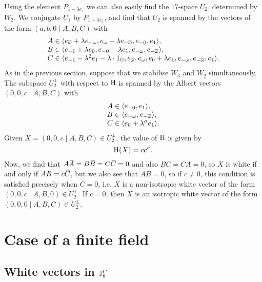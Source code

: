 Using the element $P_{1 - \lambda e_1}$ we can also easily find the $17$-space $U_2$, determined
by $W_2$. We conjugate $U_1$ by $P_{1-\lambda e_1}$, and find that $U_2$ is spanned by the vectors
of the form $(a,b,0\mid A,B,C)$ with
\begin{equation}
	\begin{array}{r@{\;}c@{\;}l}
		A & \in & \langle e_{\bar{\omega}}+\lambda e_{-\omega}, e_{\omega}-\lambda e_{-\bar{\omega}}
		, e_{-0}, e_1
		\rangle, \\
		B & \in & \langle e_{-1}+\lambda e_0, e_{-0} - \lambda e_1,
	e_{-\omega}, e_{-\bar{\omega}}  \rangle, \\
		C & \in & \langle e_{-1}-\lambda^2 e_1 - \lambda \cdot 1_{\O}, e_{\bar{\omega}}, e_{\omega},
	e_0 + \lambda e_1, e_{-\omega}, e_{-\bar{\omega}}, e_1 \rangle.
	\end{array}
\end{equation}
As in the previous section, suppose that we stabilise $W_3$ and $W_2$ simultaneously. The subspace
$U_2^{\perp}$ with respect to $\mathrm{H}$ is spanned by the Albert vectors $(0,0,c\mid A,B,C)$ with 
\begin{equation}
	\begin{array}{r@{\;}c@{\;}l}
		A & \in & \langle e_{-0}, e_{1} \rangle, \\
		B & \in & \langle e_{-\omega}, e_{-\bar{\omega}} \rangle, \\
		C & \in & \langle e_{0} + \lambda^{\s} e_1 \rangle. 
	\end{array}
\end{equation}
Given $X = (0,0,c\mid A,B,C) \in U_2^{\perp}$, the value of $\mathrm{H}$ is given by
\begin{equation}
	\mathrm{H}(X) = c c^{\sigma}. 
\end{equation}
Now, we find that $A\ovA = B\ovB = C\ovC = 0$ and also $BC = CA = 0$, so $X$ is white
if and only if $AB = c\mathord{\mbox{\hspace*{0pt}}\,\overline{\!C\!\!\;}\!\:}\mbox{\hspace*{0pt}}$, but we also see that $AB = 0$, so if $c \neq 0$, this condition
is satisfied precisely when $C = 0$, i.e. $X$ is a non-isotropic white vector of the form
$(0,0,c\mid A,B,0) \in U_2^{\perp}$. If $c = 0$, then $X$ is an isotropic white vector of the form 
$(0,0,0\mid A,B,C) \in U_2^{\perp}$. 

\section{Case of a finite field}
\subsection{White vectors in $\mathbb{J}_8^C$}

